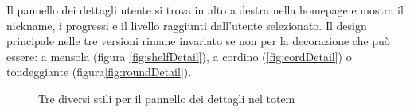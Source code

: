 Il pannello dei dettagli utente si trova in alto a destra nella homepage e mostra il nickname, i progressi e il livello raggiunti dall'utente selezionato. Il design principale nelle tre versioni rimane invariato se non per la decorazione che può essere: a mensola (figura \ref{fig:shelfDetail}), a cordino (\ref{fig:cordDetail}) o tondeggiante (figura\ref{fig:roundDetail}).
\begin{figure}
    \centering
    \caption{Tre diversi stili per il pannello dei dettagli nel totem}
    \label{fig:detailBanner}
\end{figure}


